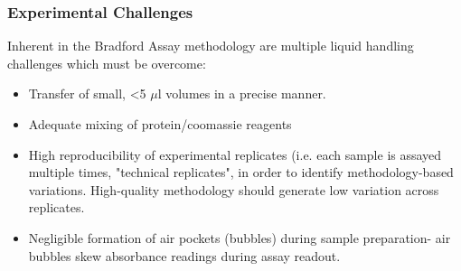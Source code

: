 \documentclass{article}
\newcommand{\Ypoint}{\item[\color{yellow}\textbullet]}
\begin{document}
\subsubsection{Experimental Challenges} 
Inherent in the Bradford Assay methodology are multiple liquid handling challenges which must be overcome:
\begin{itemize}
\Ypoint{Transfer of small, <5 $\mu$l volumes in a precise manner.}

\Ypoint{Adequate mixing of protein/coomassie reagents}

\Ypoint{High reproducibility of experimental replicates (i.e. each sample is assayed multiple times, "technical replicates", in order to identify methodology-based variations.  High-quality methodology should generate low variation across replicates.}

\Ypoint{Negligible formation of air pockets (bubbles) during sample preparation- air bubbles skew absorbance readings during assay readout.}
\end{itemize}
\end{document}
